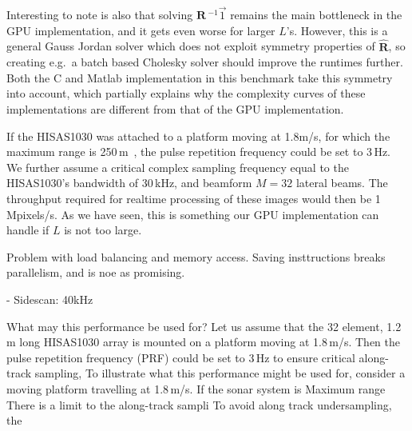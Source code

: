 \documentclass[12pt,journal,captionsoff,onecolumn]{IEEEtran}
\newcommand\mat[1]{\boldsymbol{#1}}
\newcommand\1{\vec 1}
\newcommand*\eR{\mat{\hat R}}
\newcommand*\eRi{\hat{\mat R}\,\!^{-1}}
\begin{document}
Interesting to note is also that solving $\eRi\1$ remains the main bottleneck in the \gls{GPU} implementation, and it gets even worse for larger $L$'s. However, this is a general Gauss Jordan solver which does not exploit symmetry properties of $\eR$, so creating e.g.\ a batch based Cholesky solver should improve the runtimes further. Both the C and Matlab implementation in this benchmark take this symmetry into account, which partially explains why the complexity curves of these implementations are different from that of the \gls{GPU} implementation.

If the HISAS1030 was attached to a platform moving at 1.8m/s, for which the maximum range is 250\,m~\cite{Hansen2010}, the pulse repetition frequency could be set to 3\,Hz. We further assume a critical complex sampling frequency equal to the HISAS1030's bandwidth of 30\,kHz, and beamform $M=32$ lateral beams. The throughput required for realtime processing of these images would then be 1\,Mpixels/s. As we have seen, this is something our \gls{GPU} implementation can handle if $L$ is not too large.%

Problem with load balancing and memory access. Saving insttructions breaks parallelism, and is noe as promising.

- Sidescan: 40kHz 

What may this performance be used for? Let us assume that the 32 element, 1.2\,m long HISAS1030 array is mounted on a platform moving at 1.8\,m/s. Then the pulse repetition frequency (PRF) could be set to 3\,Hz to ensure critical along-track sampling, 
To illustrate what this performance might be used for, consider a moving platform travelling at 1.8\,m/s. 
If the sonar system is Maximum range 
There is a limit to the along-track sampli
To avoid along track undersampling, the 



% 
% 
% 
\end{document}
